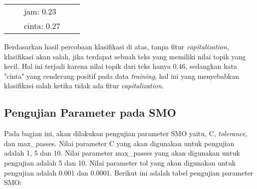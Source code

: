 \begin{enumerate}[leftmargin=*,nolistsep]
\begin{table}[H]
\begin{adjustbox}{width=1\textwidth}
\begin{tabular}{|p{1.65cm}|p{3.15cm}|p{3.45cm}|p{1.45cm}|p{1.45cm}|}
					\cline{3-3}
					& & jam: 0.23 & & \\
					\cline{3-3}
					& & cinta: 0.27 & & \\
					\hline
				\end{tabular}
			\end{adjustbox}
		\end{table}
Berdasarkan hasil percobaan klasifikasi di atas, tanpa fitur \textit{capitalization}, klasifikasi akan salah, jika terdapat sebuah teks yang memiliki nilai topik yang kecil. Hal ini terjadi karena nilai topik dari teks hanya 0.46, sedangkan kata "cinta" yang cenderung positif pada data \textit{training}, hal ini yang menyebabkan klasifikasi salah ketika tidak ada fitur \textit{capitalization}.
\end{enumerate}

\subsection{Pengujian Parameter pada SMO}
Pada bagian ini, akan dilakukan pengujian parameter SMO yaitu, C, \textit{tolerance}, dan max\_passes. Nilai parameter C yang akan digunakan untuk pengujian adalah 1, 5 dan 10. Nilai parameter max\_passes yang akan digunakan untuk pengujian adalah 5 dan 10. Nilai parameter tol yang akan digunakan untuk pengujian adalah 0.001 dan 0.0001. Berikut ini adalah tabel pengujian parameter SMO:

